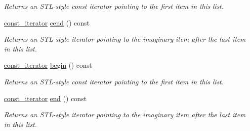 \begin{DoxyCompactItemize}
\begin{DoxyCompactList}\small\item\em Returns an S\+T\+L-\/style const iterator pointing to the first item in this list. \end{DoxyCompactList}\item 
\hyperlink{class_mdt_1_1_deploy_utils_1_1_qt_plugin_info_list_a53264e1e1de681739e375aea573ce2cf}{const\+\_\+iterator} \hyperlink{class_mdt_1_1_deploy_utils_1_1_qt_plugin_info_list_a4d32d556c4bf54bf49c4a46262be431f}{cend} () const \hypertarget{class_mdt_1_1_deploy_utils_1_1_qt_plugin_info_list_a4d32d556c4bf54bf49c4a46262be431f}{}\label{class_mdt_1_1_deploy_utils_1_1_qt_plugin_info_list_a4d32d556c4bf54bf49c4a46262be431f}

\begin{DoxyCompactList}\small\item\em Returns an S\+T\+L-\/style iterator pointing to the imaginary item after the last item in this list. \end{DoxyCompactList}\item 
\hyperlink{class_mdt_1_1_deploy_utils_1_1_qt_plugin_info_list_a53264e1e1de681739e375aea573ce2cf}{const\+\_\+iterator} \hyperlink{class_mdt_1_1_deploy_utils_1_1_qt_plugin_info_list_a39be2a319f2e33d7d330855f36b737d5}{begin} () const \hypertarget{class_mdt_1_1_deploy_utils_1_1_qt_plugin_info_list_a39be2a319f2e33d7d330855f36b737d5}{}\label{class_mdt_1_1_deploy_utils_1_1_qt_plugin_info_list_a39be2a319f2e33d7d330855f36b737d5}

\begin{DoxyCompactList}\small\item\em Returns an S\+T\+L-\/style const iterator pointing to the first item in this list. \end{DoxyCompactList}\item 
\hyperlink{class_mdt_1_1_deploy_utils_1_1_qt_plugin_info_list_a53264e1e1de681739e375aea573ce2cf}{const\+\_\+iterator} \hyperlink{class_mdt_1_1_deploy_utils_1_1_qt_plugin_info_list_abd3686b611296d2d52664644ac462104}{end} () const \hypertarget{class_mdt_1_1_deploy_utils_1_1_qt_plugin_info_list_abd3686b611296d2d52664644ac462104}{}\label{class_mdt_1_1_deploy_utils_1_1_qt_plugin_info_list_abd3686b611296d2d52664644ac462104}

\begin{DoxyCompactList}\small\item\em Returns an S\+T\+L-\/style iterator pointing to the imaginary item after the last item in this list. \end{DoxyCompactList}\end{DoxyCompactItemize}


